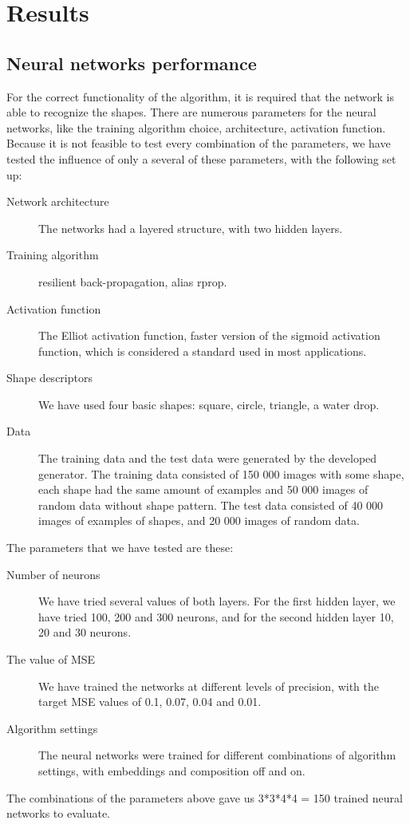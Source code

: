 \chapter{Results}

\section{Neural networks performance}
For the correct functionality of the algorithm, it is required that the network is able to recognize the shapes. There are numerous parameters for the neural networks, like the training algorithm choice, architecture, activation function. Because it is not feasible to test every combination of the parameters, we have tested the influence of only a several of these parameters, with the following set up:
\begin{description}
\item [Network architecture] The networks had a layered structure, with two hidden layers.
\item [Training algorithm] resilient back-propagation, alias rprop.
\item [Activation function] The Elliot activation function, faster version of the sigmoid activation function, which is considered a standard used in most applications.
\item [Shape descriptors] We have used four basic shapes: square, circle, triangle, a water drop. 
\item [Data] The training data and the test data were generated by the developed generator. The training data consisted of 150 000 images with some shape, each shape had the same amount of examples and 50 000 images of random data without shape pattern. The test data consisted of 40 000 images of examples of shapes, and 20 000 images of random data.
\end{description}

The parameters that we have tested are these:
\begin{description}
\item [Number of neurons] We have tried several values of both layers. For the first hidden layer, we have tried 100, 200 and 300 neurons, and for the second hidden layer 10, 20 and 30 neurons. 
\item [The value of MSE] We have trained the networks at different levels of precision, with the target MSE values of 0.1, 0.07, 0.04 and 0.01.   
\item [Algorithm settings] The neural networks were trained for different combinations of algorithm settings, with embeddings and composition off and on.
\end{description}
The combinations of the parameters above gave us 3*3*4*4 = 150 trained neural networks to evaluate.

